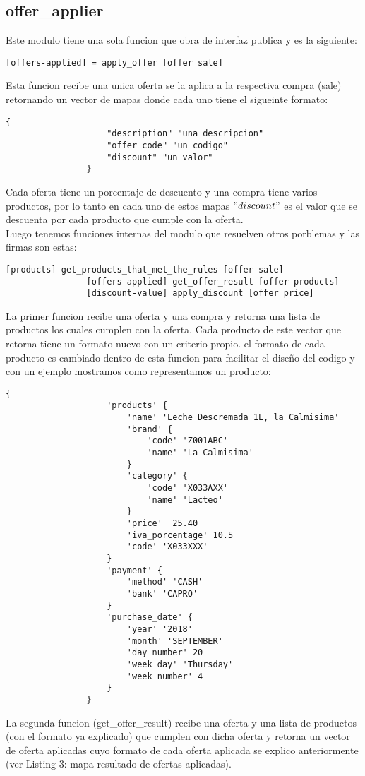 \documentclass[a4paper, 12pt]{article}
\begin{document}
		\newpage
		\subsection{offer\_applier}
			Este modulo tiene una sola funcion que obra de interfaz publica y es la siguiente:
			\begin{lstlisting}[frame=tb, caption=firmas de la interfaz publica, label=zebra, tabsize=1]
				[offers-applied] = apply_offer [offer sale]
			\end{lstlisting}
			Esta funcion recibe una unica oferta se la aplica a la respectiva compra (sale) retornando un vector de mapas donde 				cada uno tiene el sigueinte formato:
			\begin{lstlisting}[frame=tb, caption=mapa resultado de ofertas aplicadas, label=zebra, tabsize=1]
				{
					"description" "una descripcion"
					"offer_code" "un codigo"
					"discount" "un valor"
				}
			\end{lstlisting}
			Cada oferta tiene un porcentaje de descuento y una compra tiene varios productos, por lo tanto en cada uno de estos 				mapas $"discount"$ es el valor que se descuenta por cada producto que cumple con la oferta.\\
			Luego tenemos funciones internas del modulo que resuelven otros porblemas y las firmas son estas:
			\begin{lstlisting}[frame=tb, caption=firmas de las funciones privadas, label=zebra, tabsize=1]
				[products] get_products_that_met_the_rules [offer sale]
				[offers-applied] get_offer_result [offer products]
				[discount-value] apply_discount [offer price]
			\end{lstlisting}
			La primer funcion recibe una oferta y una compra y retorna una lista de productos los cuales cumplen con la oferta.
			Cada producto de este vector que retorna tiene un formato nuevo con un criterio propio. el formato de cada producto es 				cambiado dentro de esta funcion para facilitar el diseño del codigo y con un ejemplo mostramos como representamos un 				producto:
			\begin{lstlisting}[frame=tb, caption=formato de un producto, label=zebra, tabsize=1]
				{
					'products' {
						'name' 'Leche Descremada 1L, la Calmisima'
						'brand' { 
							'code' 'Z001ABC' 
							'name' 'La Calmisima' 
						}
						'category' { 
							'code' 'X033AXX' 
							'name' 'Lacteo' 
						}
						'price'  25.40
						'iva_porcentage' 10.5
						'code' 'X033XXX'
					}
					'payment' { 
						'method' 'CASH' 
						'bank' 'CAPRO' 
					}
					'purchase_date' {
						'year' '2018'
						'month' 'SEPTEMBER'
						'day_number' 20
						'week_day' 'Thursday'
						'week_number' 4
					}
				}
			\end{lstlisting}
			La segunda funcion (get\_offer\_result) recibe una oferta y una lista de productos (con el formato ya explicado) que 				cumplen con dicha oferta y retorna un vector de oferta aplicadas cuyo formato de cada oferta aplicada se explico 				anteriormente (ver Listing 3: mapa resultado de ofertas aplicadas).
		
\end{document}
